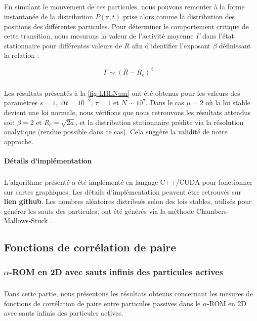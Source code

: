 \subparagraph{}En simulant le mouvement de ces particules, nous pouvons remonter à la forme instantanée de la distribution $P(\mathbf{r},t)$ prise alors comme la distribution des positions des différentes particules. Pour déterminer le comportement critique de cette transition, nous mesurons la valeur de l'activité moyenne $\Gamma$ dans l'état stationnaire pour différentes valeurs de $R$ afin d'identifier l'exposant $\beta$ définissant la relation :

\begin{equation}
	\Gamma \sim (R-R_c)^\beta
\end{equation}

\subparagraph{} Les résultats présentés à la \autoref{fig:LHLNum} ont été obtenus pour les valeurs des paramètres $s=1$, $\Delta t  = 10^{-2}$, $\tau = 1$ et $N \sim 10^7$. Dans le cas $\mu = 2$ où la loi stable devient une loi normale, nous vérifions que nous retrouvons les résultats attendus soit $\beta = 2$ et $R_c = \sqrt{2a}$, et la distribution stationnaire  prédite via la résolution analytique (rendue possible dans ce cas). Cela suggère la validité de notre approche.

\paragraph{Détails d'implémentation}

\subparagraph{}L'algorithme présenté a été implémenté en langage C++/CUDA pour fonctionner sur cartes graphiques. Les détails d'implémentation peuvent être retrouvés sur \textbf{lien github}. Les nombres aléatoires distribués selon des lois stables, utilisés pour générer les sauts des particules, ont été générés via la méthode Chambers-Mallows-Stuck \cite{chambers_method_1976, weron_chambers_mallows_stuck_1996}.

\subsection{Fonctions de corrélation de paire}

\label{sec:PCorr}

\subsubsection{$\alpha$-ROM en 2D avec sauts infinis des particules actives}

\subparagraph{}Dans cette partie, nous présentons les résultats obtenus concernant les mesures de fonctions de corrélation de paire entre particules passives dans le $\alpha$-ROM en 2D avec sauts infinis des particules actives.

